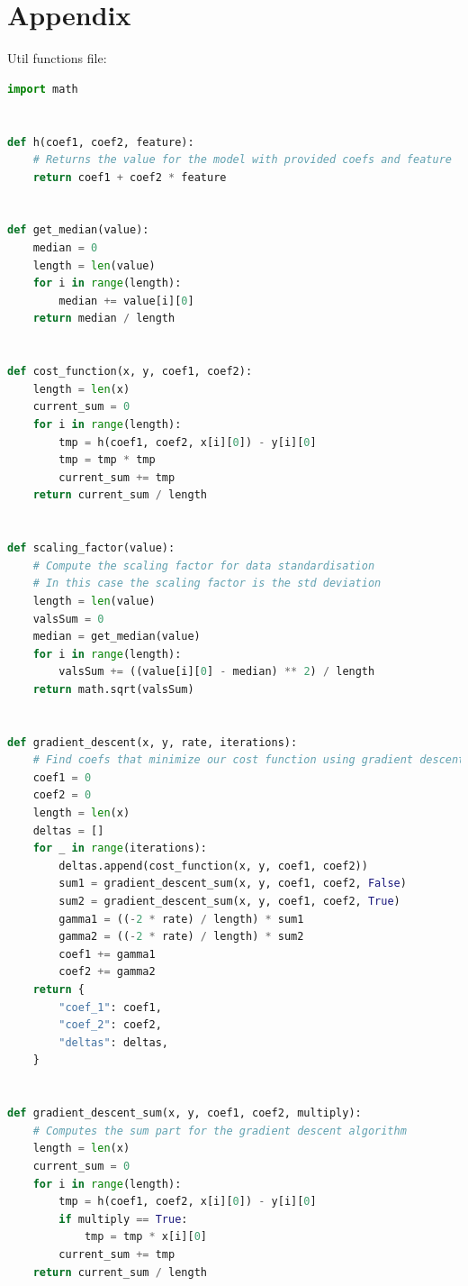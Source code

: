 \documentclass[10pt]{article}
\begin{document}
\section*{Appendix}
Util functions file:
\begin{lstlisting}[language=Python]
import math


def h(coef1, coef2, feature):
    # Returns the value for the model with provided coefs and feature
    return coef1 + coef2 * feature


def get_median(value):
    median = 0
    length = len(value)
    for i in range(length):
        median += value[i][0]
    return median / length


def cost_function(x, y, coef1, coef2):
    length = len(x)
    current_sum = 0
    for i in range(length):
        tmp = h(coef1, coef2, x[i][0]) - y[i][0]
        tmp = tmp * tmp
        current_sum += tmp
    return current_sum / length


def scaling_factor(value):
    # Compute the scaling factor for data standardisation
    # In this case the scaling factor is the std deviation
    length = len(value)
    valsSum = 0
    median = get_median(value)
    for i in range(length):
        valsSum += ((value[i][0] - median) ** 2) / length
    return math.sqrt(valsSum)


def gradient_descent(x, y, rate, iterations):
    # Find coefs that minimize our cost function using gradient descent
    coef1 = 0
    coef2 = 0
    length = len(x)
    deltas = []
    for _ in range(iterations):
        deltas.append(cost_function(x, y, coef1, coef2))
        sum1 = gradient_descent_sum(x, y, coef1, coef2, False)
        sum2 = gradient_descent_sum(x, y, coef1, coef2, True)
        gamma1 = ((-2 * rate) / length) * sum1
        gamma2 = ((-2 * rate) / length) * sum2
        coef1 += gamma1
        coef2 += gamma2
    return {
        "coef_1": coef1,
        "coef_2": coef2,
        "deltas": deltas,
    }


def gradient_descent_sum(x, y, coef1, coef2, multiply):
    # Computes the sum part for the gradient descent algorithm
    length = len(x)
    current_sum = 0
    for i in range(length):
        tmp = h(coef1, coef2, x[i][0]) - y[i][0]
        if multiply == True:
            tmp = tmp * x[i][0]
        current_sum += tmp
    return current_sum / length    
\end{lstlisting}
\end{document}
